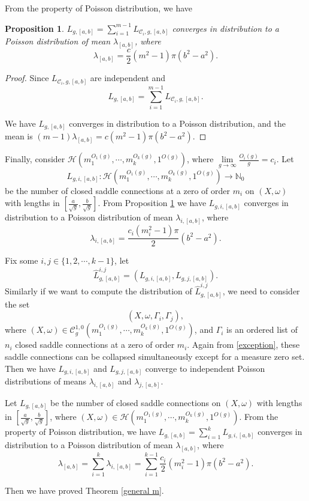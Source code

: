 \documentclass[12pt]{amsart} %
\newtheorem{proposition}[theorem]{Proposition}
\theoremstyle{definition}
\theoremstyle{remark}
\numberwithin{equation}{section}
\renewcommand\H{{\mathcal H}}
\begin{document}
From the property of Poisson distribution, we have
\begin{proposition}\label{order m}
$L_{g,[a,b]}=\sum\limits_{i=1}^{m-1}L_{\mathcal{C}_i,g,[a,b]}$ converges in distribution to a Poisson distribution of mean $\lambda_{[a,b]}$, where
$$\lambda_{[a,b]}=\frac{c}{2}(m^2-1)\pi(b^2-a^2).$$
\end{proposition}

\begin{proof}
Since $L_{\mathcal{C}_i,g,[a,b]}$ are independent and 
$$L_{g,[a,b]}=\sum_{i=1}^{m-1}L_{\mathcal{C}_i,g,[a,b]}.$$

We have 
$L_{g,[a,b]}$ converges in distribution to a Poisson distribution, and the mean is
$(m-1)\lambda_{[a,b]}=c(m^2-1)\pi(b^2-a^2)$.
\end{proof}

Finally, consider $\H(m_1^{O_1(g)},\cdots,m_k^{O_k(g)},1^{O(g)})$, where $\lim\limits_{g\to \infty}\frac{O_i(g)}{g}=c_i.$
Let 
$$L_{g,i,[a,b]}:\H(m_1^{O_1(g)},\cdots,m_k^{O_k(g)},1^{O(g)}) \to \mathbb{N}_0$$
be the number of closed saddle connections at a zero of order $m_i$ on $(X,\omega)$ with lengths in $[\frac{a}{\sqrt{g}},\frac{b}{\sqrt{g}}]$.
From Proposition \ref{order m} we have $L_{g,i,[a,b]}$ converges in distribution to a Poisson distribution of mean $\lambda_{i,[a,b]}$, where
$$\lambda_{i,[a,b]}=\frac{c_i(m_i^2-1)\pi}{2}(b^2-a^2).$$

Fix some $i,j\in \{1,2,\cdots,k-1\}$,
let
$$\hat{L}^{i,j}_{g,[a,b]}=(L_{g,i,[a,b]},L_{g,j,[a,b]}).$$
Similarly if we want to compute the distribution of $\hat{L}^{i,j}_{g,[a,b]}$, we need to consider the set 
$$(X,\omega,\Gamma_i,\Gamma_j),$$
where $(X,\omega)\in \mathcal{C}^{1,0}_{g}(m_1^{O_1(g)},\cdots,m_k^{O_k(g)},1^{O(g)})$, 
and $\Gamma_i$ is an ordered list of $n_i$ closed saddle connections at a zero of order $m_i$.
Again from \ref{exception}, these saddle connections can be collapsed simultaneously except for a measure zero set.
Then we have $L_{g,i,[a,b]}$ and $L_{g,j,[a,b]}$ converge to independent Poisson distributions of means $\lambda_{i,[a,b]}$ and $\lambda_{j,[a,b]}$.

Let $L_{g,[a,b]}$ be the number of closed saddle connections on $(X,\omega)$ with lengths in $[\frac{a}{\sqrt{g}},\frac{b}{\sqrt{g}}]$,
where $(X,\omega)\in \H(m_1^{O_1(g)},\cdots,m_k^{O_k(g)},1^{O(g)})$.
From the property of Poisson distribution,  we have $L_{g,[a,b]}=\sum\limits_{i=1}^{k}L_{g,i,[a,b]}$ converges in distribution to a Poisson distribution of mean $\lambda_{[a,b]}$, where
$$\lambda_{[a,b]}=\sum_{i=1}^{k} \lambda_{i,[a,b]}=\sum_{i=1}^{k-1}\frac{c_i}{2}(m_i^2-1)\pi(b^2-a^2).$$

Then we have proved Theorem \ref{general m}.




\end{document}
